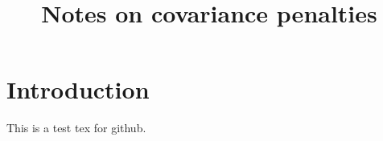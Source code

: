 \documentclass{article}
\title{Notes on covariance penalties}
\theoremstyle{definition}
\theoremstyle{remark}
\begin{document}
\maketitle


\section{Introduction}
This is a test tex for github.
\end{document}
